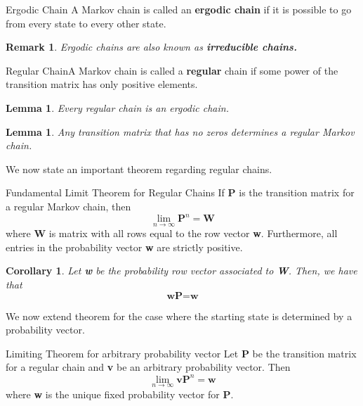 \documentclass[twoside]{article}
\newtheorem{lemma}[theorem]{Lemma}
\newtheorem{corollary}[theorem]{Corollary}
\newtheorem{remark}[theorem]{Remark}
\begin{document}
\begin{definition_exam}{Ergodic Chain}{} A Markov chain is called an \textbf{ergodic chain} if it is possible to go from every state to every other state.
\end{definition_exam}

\begin{remark}Ergodic chains are also known as \textbf{irreducible chains.}
\end{remark}

\begin{definition_exam}{Regular Chain}{}A Markov chain is called a \textbf{regular} chain if some power of the transition matrix has only positive elements.
\end{definition_exam}

\begin{lemma} Every regular chain is an ergodic chain.
\end{lemma}

\begin{lemma} Any transition matrix that has no zeros determines a regular Markov chain.
\end{lemma}

We now state an important theorem regarding regular chains.
\begin{theorem_exam}{Fundamental Limit Theorem for Regular Chains}{} If \textbf{P} is the transition matrix for a regular Markov chain, then 
$$
\lim_{n \rightarrow \infty}\textbf{P}^n = \textbf{W}
$$
where \textbf{W} is matrix with all rows equal to the row vector \textbf{w}. Furthermore, all entries in the probability vector \textbf{w} are strictly positive.
\end{theorem_exam}

\begin{corollary} Let \textbf{w} be the probability row vector associated to \textbf{W}. Then, we have that 
$$
\textbf{w}\textbf{P} = \textbf{w}
$$
\end{corollary}

We now extend theorem for the case where the starting state is determined by a probability vector. 
\begin{theorem_exam}{Limiting Theorem for arbitrary probability vector}{} Let \textbf{P} be the transition matrix for a regular chain and \textbf{v} be an arbitrary probability vector. Then 
$$
\lim_{n \rightarrow \infty}\textbf{v}\textbf{P}^{n} = \textbf{w}
$$
where \textbf{w} is the unique fixed probability vector for \textbf{P}.
\end{theorem_exam}
\end{document}
